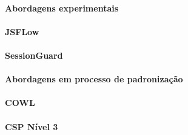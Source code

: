 \paragraph{Abordagens experimentais}
\paragraph{JSFLow}
\paragraph{SessionGuard}


\paragraph{Abordagens em processo de padronização}
\paragraph{COWL}
\paragraph{CSP Nível 3}
